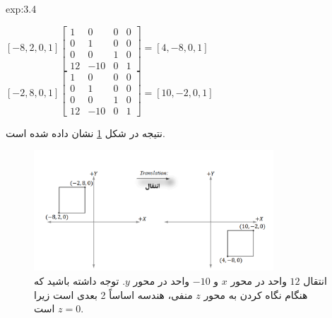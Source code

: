 {\begin{spacing}{1.5}
\begin{example}{exp:3.4}
            \begin{center}
                $[-8, 2, 0, 1]\begin{bmatrix}
                                  1  & 0   & 0 & 0 \\
                                  0  & 1   & 0 & 0 \\
                                  0  & 0   & 1 & 0 \\
                                  12 & -10 & 0 & 1
                \end{bmatrix}=[4, -8, 0, 1]$ \\
                $[-2, 8, 0, 1]\begin{bmatrix}
                                  1  & 0   & 0 & 0 \\
                                  0  & 1   & 0 & 0 \\
                                  0  & 0   & 1 & 0 \\
                                  12 & -10 & 0 & 1
                \end{bmatrix}=[10, -2, 0, 1]$
            \end{center}

            نتیجه در شکل \ref{fig:4.Session.1.3.6} نشان داده شده است.

            \begin{figure}[H]
                \centering
                \setlength{\belowcaptionskip}{-10pt}
                \includegraphics[width=0.8\textwidth]{Images/4/3/4.Session.1.3.6}
                \caption {انتقال $12$ واحد در محور $x$ و $-10$ واحد در محور $y$.
                توجه داشته باشید که هنگام نگاه کردن به محور $z$ منفی، هندسه اساساً 2 بعدی است زیرا $z=0$ است. \textbf{\vspace{20pt}}}
                \label{fig:4.Session.1.3.6}
            \end{figure}
        \end{example}


\end{spacing}}
